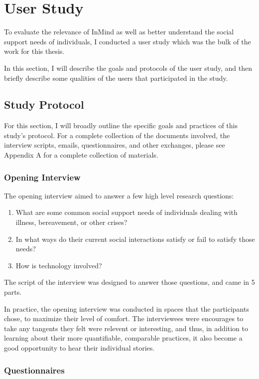 \chapter{User Study}
To evaluate the relevance of InMind as well as better understand
the social support needs of individuals,
I conducted a user study which was the bulk of the work for this thesis.

In this section, I will describe the goals and protocols of the user study,
and then briefly describe some qualities of the users that participated
in the study.

\section{Study Protocol}
  For this section, I will broadly outline the specific goals
  and practices of this study's protocol.
  For a complete collection of the documents involved,
  the interview scripts, emails, questionnaires, and other exchanges,
  please see Appendix A for a complete collection of materials.
  
  \subsection{Opening Interview}
  The opening interview aimed to answer a few high level research questions:
  \begin{enumerate}
  \item What are some common social support needs of individuals
  dealing with illness, bereavement, or other crises?
  \item In what ways do their current social interactions satisfy
  or fail to satisfy those needs?
  \item How is technology involved?
  \end{enumerate}

  The script of the interview was designed to answer those questions,
  and came in 5 parts.

  In practice, the opening interview was conducted in spaces
  that the participants chose, to maximize their level of comfort.
  The interviewees were encourages to take any tangents they felt
  were relevent or interesting, and thus,
  in addition to learning about their more quantifiable, comparable practices,
  it also become a good opportunity to hear their individual stories.
    

  \subsection{Questionnaires}

